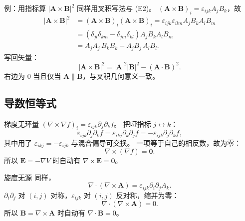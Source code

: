 \documentclass[fontset=windows, chinese, 10pt, xcolor=dvipsnames]{beamer}
\begin{document}
\begin{frame}{例：用指标算 $|\mathbf{A}\times\mathbf{B}|^2$}
  \footnotesize
  同样用叉积写法与 (E2)。
  $(\mathbf{A}\times\mathbf{B})_i=\varepsilon_{ijk}A_j B_k$，故
  \begin{align*}
    |\mathbf{A}\times\mathbf{B}|^2
    &=(\mathbf{A}\times\mathbf{B})_i(\mathbf{A}\times\mathbf{B})_i
    =\varepsilon_{ijk}\varepsilon_{ilm}A_j B_k A_l B_m \\
    &=(\delta_{jl}\delta_{km}-\delta_{jm}\delta_{kl})
      A_j B_k A_l B_m \\
    &=A_j A_j\, B_k B_k
      -A_j B_j\, A_l B_l.
  \end{align*}
  写回矢量：
  \begin{equation*}
    \boxed{|\mathbf{A}\times\mathbf{B}|^2
    =|\mathbf{A}|^2|\mathbf{B}|^2
      -(\mathbf{A}\cdot\mathbf{B})^2.}
  \end{equation*}
  右边为 $0$ 当且仅当 $\mathbf{A}\parallel\mathbf{B}$，与叉积几何意义一致。
\end{frame}

\subsection{导数恒等式}

\begin{frame}{梯度无环量}
  $(\nabla\times\nabla f)_i=\varepsilon_{ijk}\partial_j\partial_k f$。
  把哑指标 $j\leftrightarrow k$：
  \begin{equation*}
    \varepsilon_{ijk}\partial_j\partial_k f
    =\varepsilon_{ikj}\partial_k\partial_j f
    =-\varepsilon_{ijk}\partial_j\partial_k f,
  \end{equation*}
  其中用了 $\varepsilon_{ikj}=-\varepsilon_{ijk}$ 与混合偏导可交换。
  一项等于自己的相反数，故为零：
  \begin{equation*}
    \boxed{\nabla\times(\nabla f)=\mathbf{0}.}
  \end{equation*}
  所以 $\mathbf{E}=-\nabla V$ 时自动有 $\nabla\times\mathbf{E}=\mathbf{0}$。
\end{frame}

\begin{frame}{旋度无源}
  同样，
  \begin{equation*}
    \nabla\cdot(\nabla\times\mathbf{A})
    =\varepsilon_{ijk}\partial_i\partial_j A_k.
  \end{equation*}
  $\partial_i\partial_j$ 对 $(i,j)$ 对称，$\varepsilon_{ijk}$ 对 $(i,j)$ 反对称，缩并为零：
  \begin{equation*}
    \boxed{\nabla\cdot(\nabla\times\mathbf{A})=0.}
  \end{equation*}
  所以 $\mathbf{B}=\nabla\times\mathbf{A}$ 时自动有 $\nabla\cdot\mathbf{B}=0$。
\end{frame}
\end{document}
